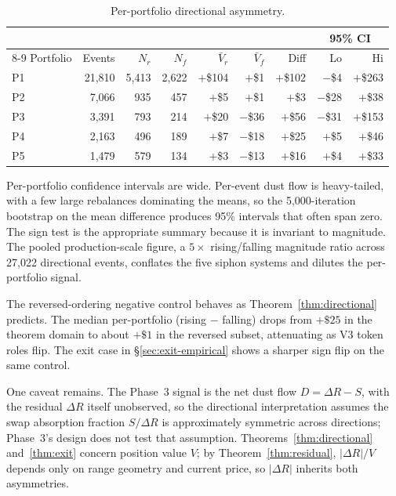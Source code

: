 \documentclass{manuscript}
\begin{document}
\begin{table}[H]
\centering
\caption{Per-portfolio directional asymmetry.}
\label{tab:directional-phase3}
\begin{tabular}{@{}lrrrrrrrr@{}}
\toprule
 & & & & & & & \multicolumn{2}{c}{95\% CI} \\
\cmidrule(lr){8-9}
Portfolio & Events & $N_r$ & $N_f$ & $\bar V_r$ & $\bar V_f$ & Diff & Lo & Hi \\
\midrule
P1 & 21{,}810 & 5{,}413 & 2{,}622 & $+$\$104 & $+$\$1   & $+$\$102 & $-$\$4  & $+$\$263 \\
P2 & 7{,}066  & 935     & 457     & $+$\$5   & $+$\$1   & $+$\$3   & $-$\$28 & $+$\$38  \\
P3 & 3{,}391  & 793     & 214     & $+$\$20  & $-$\$36  & $+$\$56  & $-$\$31 & $+$\$153 \\
P4 & 2{,}163  & 496     & 189     & $+$\$7   & $-$\$18  & $+$\$25  & $+$\$5  & $+$\$46  \\
P5 & 1{,}479  & 579     & 134     & $+$\$3   & $-$\$13  & $+$\$16  & $+$\$4  & $+$\$33  \\
\bottomrule
\end{tabular}
\end{table}

Per-portfolio confidence intervals are wide. Per-event dust flow is heavy-tailed, with a few large rebalances dominating the means, so the 5{,}000-iteration bootstrap on the mean difference produces 95\% intervals that often span zero. The sign test is the appropriate summary because it is invariant to magnitude. The pooled production-scale figure, a $5\times$ rising/falling magnitude ratio across 27{,}022 directional events, conflates the five siphon systems and dilutes the per-portfolio signal.

The reversed-ordering negative control behaves as Theorem~\ref{thm:directional} predicts. The median per-portfolio (rising $-$ falling) drops from $+\$25$ in the theorem domain to about $+\$1$ in the reversed subset, attenuating as V3 token roles flip. The exit case in \S\ref{sec:exit-empirical} shows a sharper sign flip on the same control.

One caveat remains. The Phase~3 signal is the net dust flow $D = \Delta R - S$, with the residual $\Delta R$ itself unobserved, so the directional interpretation assumes the swap absorption fraction $S/\Delta R$ is approximately symmetric across directions; Phase~3's design does not test that assumption. Theorems~\ref{thm:directional} and~\ref{thm:exit} concern position value $V$; by Theorem~\ref{thm:residual}, $|\Delta R|/V$ depends only on range geometry and current price, so $|\Delta R|$ inherits both asymmetries.
\end{document}
